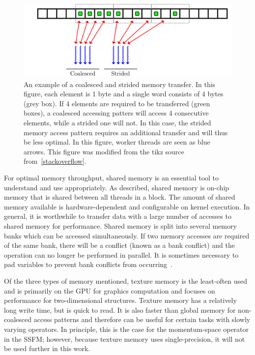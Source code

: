 \begin{figure}
\includegraphics[width=\textwidth]{data/gpu/coalesce/check.pdf}
\caption{An example of a coalesced and strided memory transfer.
In this figure, each element is 1 byte and a single word consists of 4 bytes (grey box).
If 4 elements are required to be transferred (green boxes), a coalesced accessing patters will access 4 consecutive elements, while a strided one will not.
In this case, the strided memory access pattern requires an additional transfer and will thus be less optimal.
In this figure, worker threads are seen as blue arrows.
This figure was modified from the tikz source from~\ref{stackoverflow}.}
\label{fig:coalesce}
\end{figure}

For optimal memory throughput, shared memory is an essential tool to understand and use appropriately.
As described, shared memory is on-chip memory that is shared between all threads in a block.
The amount of shared memory available is hardware-dependent and configurable on kernel execution.
In general, it is worthwhile to transfer data with a large number of accesses to shared memory for performance.
Shared memory is split into several memory banks which can be accessed simultaneously.
If two memory accesses are required of the same bank, there will be a conflict (known as a bank conflict) and the operation can no longer be performed in parallel.
It is sometimes necessary to pad variables to prevent bank conflicts from occurring~\cite{harris2013}.

Of the three types of memory mentioned, texture memory is the least-often used and is primarily on the GPU for graphics computation and focuses on performance for two-dimensional structures.
Texture memory has a relatively long write time, but is quick to read.
It is also faster than global memory for non-coalesced access patterns and therefore can be useful for certain tasks with slowly varying operators.
In principle, this is the case for the momentum-space operator in the SSFM; however, because texture memory uses single-precision, it will not be used further in this work.

